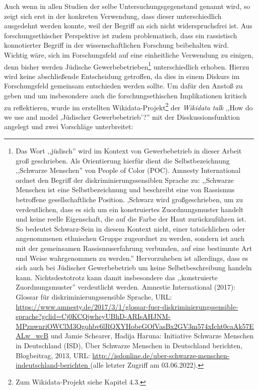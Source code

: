 Auch wenn in allen Studien der selbe Untersuchungsgegenstand genannt wird, so zeigt sich erst in der konkreten Verwendung, dass dieser unterschiedlich ausgedehnt werden konnte, weil der Begriff an sich nicht widerspruchsfrei ist. Aus forschungsethischer Perspektive ist zudem problematisch, dass ein rassistisch konnotierter Begriff in der wissenschaftlichen Forschung beibehalten wird. Wichtig wäre, sich im Forschungsfeld auf eine einheitliche Verwendung zu einigen, denn bisher werden Jüdische Gewerbebetrieben\footnote{Das Wort ,,jüdisch'' wird im Kontext von Gewerbebetrieb in dieser Arbeit groß geschrieben. Als Orientierung hierfür dient die Selbstbezeichnung ,,Schwarze Menschen'' von People of Color (POC). Amnesty International ordnet den Begriff der diskriminierungssensiblen Sprache zu: ,,Schwarze Menschen ist eine Selbstbezeichnung und beschreibt eine von Rassismus betroffene gesellschaftliche Position. ,Schwarz wird großgeschrieben, um zu verdeutlichen, dass es sich um ein konstruiertes Zuordnungsmuster handelt und keine reelle Eigenschaft, die auf die Farbe der Haut zurückzuführen ist. So bedeutet Schwarz-Sein in diesem Kontext nicht, einer tatsächlichen oder angenommenen ethnischen Gruppe zugeordnet zu werden, sondern ist auch mit der gemeinsamen Rassismuserfahrung verbunden, auf eine bestimmte Art und Weise wahrgenommen zu werden.'' Hervorzuheben ist allerdings, dass es sich auch bei Jüdischer Gewerbebetrieb um keine Selbstbeschreibung handeln kann. Nichtsdestotrotz kann damit insbesondere das ,,konstruierte Zuordnungsmuster'' verdeutlicht werden. Amnestie International (2017): Glossar für diskriminierungssensible Sprache, URL: \url{https://www.amnesty.de/2017/3/1/glossar-fuer-diskriminierungssensible-sprache?gclid=Cj0KCQjwheyUBhD-ARIsAHJNM-MPznwnriOWClM3Qgqhbv6lRQXYHobeGOfVasBx2GV3m574xIcht0caAk57EALw_wcB} und Jamie Schearer, Hadija Haruna: Initiative Schwarze Menschen in Deutschland (ISD), Über Schwarze Menschen in Deutschland berichten, Blogbeitrag, 2013, URL: \url{http://isdonline.de/uber-schwarze-menschen-indeutschland-berichten } (alle letzter Zugriff am 03.06.2022).} unterschiedlich erhoben. Hierzu wird keine abschließende Entscheidung getroffen, da dies in einem Diskurs im Forschungsfeld gemeinsam entschieden werden sollte. Um dafür den Anstoß zu geben und um insbesondere auch die forschungsethischen Implikationen kritisch zu reflektieren, wurde im erstellten Wikidata-Projekt\footnote{Zum Wikidata-Projekt siehe Kapitel 4.3.} der \textit{Wikidata talk} ,,How do we use and model ,Jüdischer Gewerbebetrieb'?'' mit der Disskussionsfunktion angelegt und zwei Vorschläge unterbreitet: 


